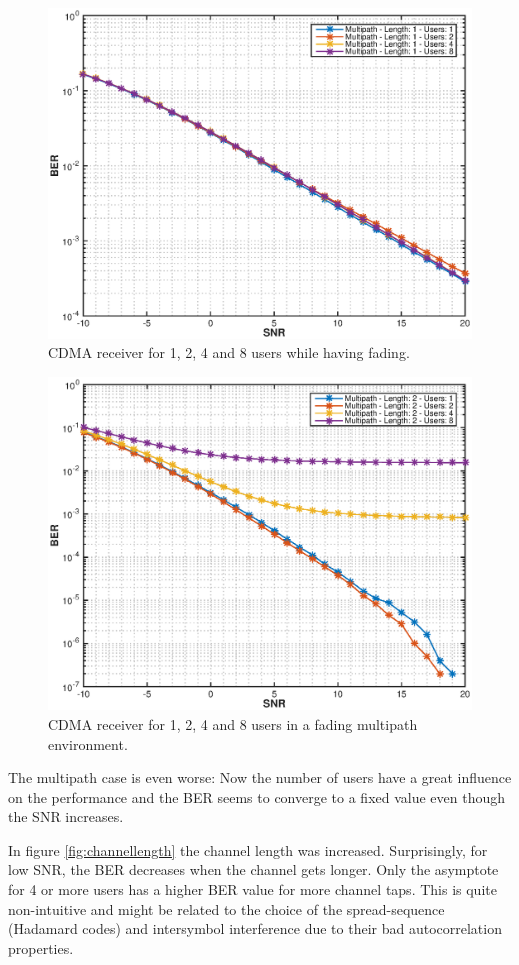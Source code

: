 \documentclass[a4paper]{article}
\begin{document}
\begin{figure}[htbp]
\begin{center}
\includegraphics[width=.6\textwidth]{img1/1b3.eps}
\caption{CDMA receiver for 1, 2, 4 and 8 users while having fading.}
\label{fig:1b3}
\end{center}
\end{figure}


\begin{figure}[htbp]
\begin{center}
\includegraphics[width=.6\textwidth]{img1/1b4.eps}
\caption{CDMA receiver for 1, 2, 4 and 8 users in a fading multipath environment.}
\label{fig:1b4}
\end{center}
\end{figure}

The multipath case is even worse: Now the number of users have a great influence on the performance and the BER seems to converge to a fixed value even though the SNR increases.

In figure \ref{fig:channellength} the channel length was increased. Surprisingly, for low SNR, the BER decreases when the channel gets longer. Only the asymptote for 4 or more users has a higher BER value for more channel taps. This is quite non-intuitive and might be related to the choice of the spread-sequence (Hadamard codes) and intersymbol interference due to their bad autocorrelation properties.
\end{document}
